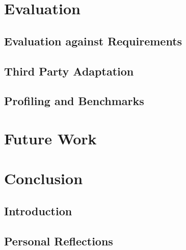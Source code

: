 \documentclass[12pt, a4paper]{article}
\begin{document}

\section{Evaluation}


\subsection{Evaluation against Requirements}


\subsection{Third Party Adaptation}


\subsection{Profiling and Benchmarks}


\section{Future Work}


\section{Conclusion}


\subsection{Introduction}


\subsection{Personal Reflections}
\end{document}
